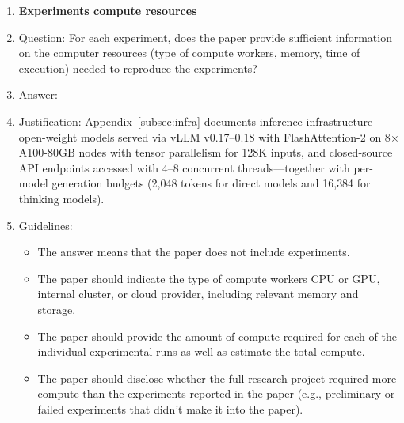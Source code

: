 \documentclass{article}
\begin{document}
\begin{enumerate}
\item {\bf Experiments compute resources}
    \item[] Question: For each experiment, does the paper provide sufficient information on the computer resources (type of compute workers, memory, time of execution) needed to reproduce the experiments?
    \item[] Answer: \answerYes{}
    \item[] Justification: Appendix~\ref{subsec:infra} documents inference infrastructure---open-weight models served via vLLM v0.17--0.18 with FlashAttention-2 on 8$\times$A100-80GB nodes with tensor parallelism for 128K inputs, and closed-source API endpoints accessed with 4--8 concurrent threads---together with per-model generation budgets (2{,}048 tokens for direct models and 16{,}384 for thinking models).
    \item[] Guidelines:
    \begin{itemize}
        \item The answer \answerNA{} means that the paper does not include experiments.
        \item The paper should indicate the type of compute workers CPU or GPU, internal cluster, or cloud provider, including relevant memory and storage.
        \item The paper should provide the amount of compute required for each of the individual experimental runs as well as estimate the total compute.
        \item The paper should disclose whether the full research project required more compute than the experiments reported in the paper (e.g., preliminary or failed experiments that didn't make it into the paper).
    \end{itemize}


\end{enumerate}
\end{document}
